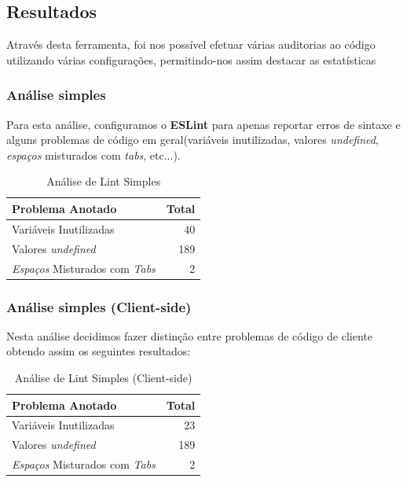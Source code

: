 \documentclass[a4paper,12pt]{article} %
\begin{document}
\newpage
\subsection{Resultados}
Através desta ferramenta, foi nos possível efetuar várias auditorias ao código utilizando várias configurações, permitindo-nos assim destacar as estatísticas

\subsubsection{Análise simples}
Para esta análise, configuramos o \textbf{ESLint} para apenas reportar erros de sintaxe e alguns problemas de código em geral(variáveis inutilizadas, valores \textit{undefined}, \textit{espaços} misturados com \textit{tabs}, etc...).

\vspace{1cm}
\begin{table}[!ht]
	\centering
	\begin{tabular}{|l|r|}
		\hline
		\textbf{Problema Anotado} & \textbf{Total} \\
		\hline
		Variáveis Inutilizadas & 40 \\
		\hline
		Valores \textit{undefined} & 189 \\
		\hline
		\textit{Espaços} Misturados com \textit{Tabs} & 2 \\
		\hline
	\end{tabular}
	\caption{Análise de Lint Simples}
\end{table}

\subsubsection{Análise simples (Client-side)}
Nesta análise decidimos fazer distinção entre problemas de código de cliente obtendo assim os seguintes resultados:

\vspace{1cm}
\begin{table}[!ht]
	\centering
	\begin{tabular}{|l|r|}
		\hline
		\textbf{Problema Anotado} & \textbf{Total} \\
		\hline
		Variáveis Inutilizadas & 23 \\
		\hline
		Valores \textit{undefined} & 189 \\
		\hline
		\textit{Espaços} Misturados com \textit{Tabs} & 2 \\
		\hline
	\end{tabular}
	\caption{Análise de Lint Simples (Client-side)}
\end{table}
\end{document}
